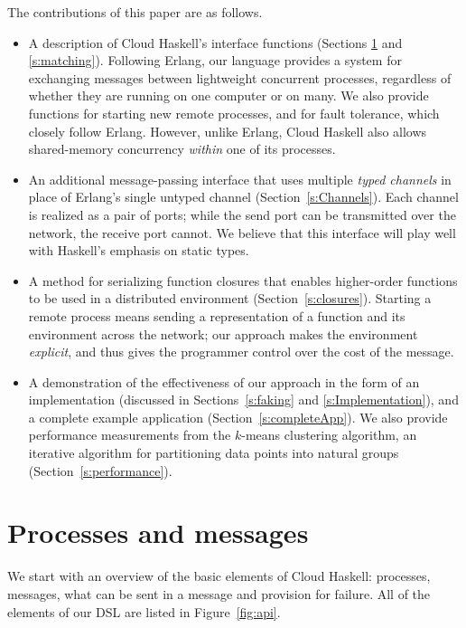 \documentclass[preprint]{sigplanconf}
\begin{document}
The contributions of this paper are as follows.
\begin{itemize}
\item A description of Cloud Haskell's interface functions (Sections \ref{s:ProcessesAndMessages} and \ref{s:matching}). Following Erlang, our language provides a system for exchanging messages between lightweight concurrent processes, regardless of whether they are running on one computer or on many. We also provide functions for starting new remote processes, and for fault tolerance, which closely follow Erlang. 
However, unlike Erlang, Cloud Haskell also allows shared-memory concurrency \emph{within} one of its processes.

\item An additional message-passing interface that uses multiple \emph{typed channels} in place of Erlang's single untyped channel (Section~\ref{s:Channels}).  Each channel is realized as a pair of ports; while the send port can be transmitted over the network, the receive port cannot. We believe that this interface will play well with Haskell's emphasis on static types.

\item A method for serializing function closures that enables higher-order functions to be used in a distributed environment (Section~\ref{s:closures}). Starting a remote process means sending a representation of a function and its environment across the network;  our approach makes the environment \emph{explicit}, and thus gives the programmer control over the cost of the message.

\item A demonstration of the effectiveness of our approach in the form of an implementation (discussed in Sections~\ref{s:faking} and \ref{s:Implementation}), and a complete example application (Section~\ref{s:completeApp}).
We also provide performance measurements from the $k$-means clustering algorithm, an iterative algorithm for partitioning data points into natural groups (Section~\ref{s:performance}). 
\end{itemize}
\pagebreak

\section{Processes and messages}
\label{s:ProcessesAndMessages}

We start with an overview of the basic elements of Cloud Haskell:
processes, messages, what can be sent in a message and provision for failure.
All of the elements of our DSL are listed in Figure~\ref{fig:api}.
\end{document}
